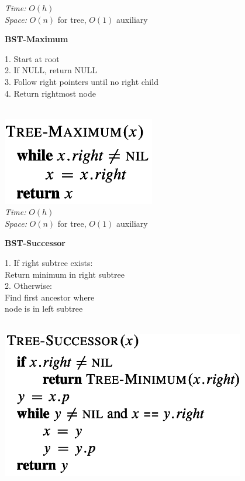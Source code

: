 {\begin{minipage}[t]{1\textwidth}
\begin{minipage}[t]{0.19\textwidth}
        \textit{Time:} \(O(h)\)\\
        \textit{Space:} \(O(n)\) for tree, \(O(1)\) auxiliary
    \end{minipage}
    \hfill
    \begin{minipage}[t]{0.19\textwidth}
        \centering
        \textbf{\scriptsize BST-Maximum}\\[2pt]
       \tiny
        \begin{minipage}[t]{\textwidth}
           \tiny
            1. Start at root\\
            2. If NULL, return NULL\\
            3. Follow right pointers until no right child\\
            4. Return rightmost node
        \end{minipage}\\[8pt]
        \includegraphics[width=0.5\textwidth]{images/bst-maximum.png}\\[2pt]
        \textit{Time:} \(O(h)\)\\
        \textit{Space:} \(O(n)\) for tree, \(O(1)\) auxiliary
    \end{minipage}
    \hfill
    \begin{minipage}[t]{0.19\textwidth}
        \centering
        \textbf{\scriptsize BST-Successor}\\[2pt]
       \tiny
        \begin{minipage}[t]{\textwidth}
           \tiny
            1. If right subtree exists:\\
            \quad Return minimum in right subtree\\
            2. Otherwise:\\
            \quad Find first ancestor where\\
            \quad node is in left subtree
        \end{minipage}\\[4pt]
        \includegraphics[width=0.8\textwidth]{images/bst-successor.png}\\[2pt]

\end{minipage}
\end{minipage}}
